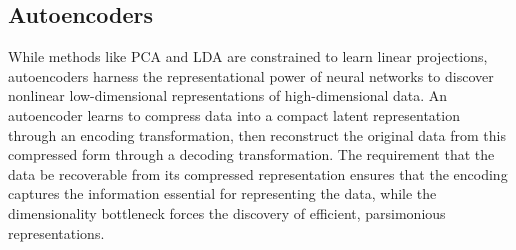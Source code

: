 %
%
%
%
%

\subsection*{Autoencoders}

While methods like PCA and LDA are constrained to learn linear projections, autoencoders harness the representational power of neural networks to discover nonlinear low-dimensional representations of high-dimensional data. An autoencoder learns to compress data into a compact latent representation through an encoding transformation, then reconstruct the original data from this compressed form through a decoding transformation. The requirement that the data be recoverable from its compressed representation ensures that the encoding captures the information essential for representing the data, while the dimensionality bottleneck forces the discovery of efficient, parsimonious representations.

